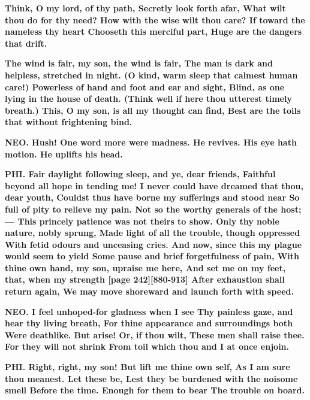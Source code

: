 \documentclass[11pt,letter]{book}
\begin{document}
\par \textbf{Think, O my lord, of thy path, Secretly look forth afar, What wilt thou do for thy need? How with the wise wilt thou care? If toward the nameless thy heart Chooseth this merciful part, Huge are the dangers that drift.}
\par 

\par \textbf{The wind is fair, my son, the wind is fair, The man is dark and helpless, stretched in night. (O kind, warm sleep that calmest human care!) Powerless of hand and foot and ear and sight, Blind, as one lying in the house of death. (Think well if here thou utterest timely breath.) This, O my son, is all my thought can find, Best are the toils that without frightening bind.}
\par 

\par \textbf{NEO. Hush! One word more were madness. He revives. His eye hath motion. He uplifts his head.}
\par 

\par \textbf{PHI. Fair daylight following sleep, and ye, dear friends, Faithful beyond all hope in tending me! I never could have dreamed that thou, dear youth, Couldst thus have borne my sufferings and stood near So full of pity to relieve my pain. Not so the worthy generals of the host;— This princely patience was not theirs to show. Only thy noble nature, nobly sprung, Made light of all the trouble, though oppressed With fetid odours and unceasing cries. And now, since this my plague would seem to yield Some pause and brief forgetfulness of pain, With thine own hand, my son, upraise me here, And set me on my feet, that, when my strength [page 242][880-913] After exhaustion shall return again, We may move shoreward and launch forth with speed.}
\par 

\par \textbf{NEO. I feel unhoped-for gladness when I see Thy painless gaze, and hear thy living breath, For thine appearance and surroundings both Were deathlike. But arise! Or, if thou wilt, These men shall raise thee. For they will not shrink From toil which thou and I at once enjoin.}
\par 

\par \textbf{PHI. Right, right, my son! But lift me thine own self, As I am sure thou meanest. Let these be, Lest they be burdened with the noisome smell Before the time. Enough for them to bear The trouble on board.}
\par 
\end{document}
